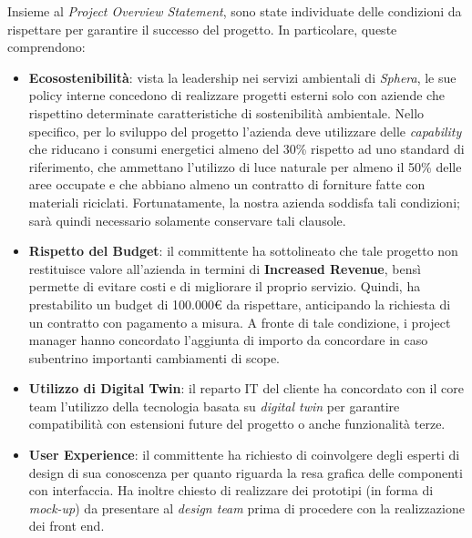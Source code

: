 Insieme al \textit{Project Overview Statement}, sono state individuate delle condizioni da rispettare per garantire il successo del progetto. In particolare, queste comprendono:
\begin{itemize}
    \item \textbf{Ecosostenibilità}: vista la leadership nei servizi ambientali di \textit{Sphera}, le sue policy interne concedono di realizzare progetti esterni solo con aziende che rispettino determinate caratteristiche di sostenibilità ambientale. Nello specifico, per lo sviluppo del progetto l'azienda deve utilizzare delle \textit{capability} che riducano i consumi energetici almeno del 30\% rispetto ad uno standard di riferimento, che ammettano l'utilizzo di luce naturale per almeno il 50\% delle aree occupate e che abbiano almeno un contratto di forniture fatte con materiali riciclati. Fortunatamente, la nostra azienda soddisfa tali condizioni; sarà quindi necessario solamente conservare tali clausole.
    \item \textbf{Rispetto del Budget}: il committente ha sottolineato che tale progetto non restituisce valore all'azienda in termini di \textbf{Increased Revenue}, bensì permette di evitare costi e di migliorare il proprio servizio. Quindi, ha prestabilito un budget di 100.000€ da rispettare, anticipando la richiesta di un contratto con pagamento a misura. A fronte di tale condizione, i project manager hanno concordato l'aggiunta di importo da concordare in caso subentrino importanti cambiamenti di scope.
    \item \textbf{Utilizzo di Digital Twin}: il reparto IT del cliente ha concordato con il core team l'utilizzo della tecnologia basata su \textit{digital twin} per garantire compatibilità con estensioni future del progetto o anche funzionalità terze.
    \item \textbf{User Experience}: il committente ha richiesto di coinvolgere degli esperti di design di sua conoscenza per quanto riguarda la resa grafica delle componenti con interfaccia. Ha inoltre chiesto di realizzare dei prototipi (in forma di \textit{mock-up}) da presentare al \textit{design team} prima di procedere con la realizzazione dei front end.
\end{itemize}